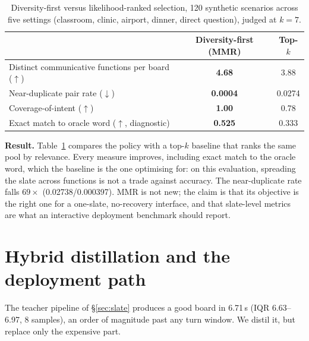 \begin{table}[t]
\centering
\small
\caption{Diversity-first versus likelihood-ranked selection, 120 synthetic
scenarios across five settings (classroom, clinic, airport, dinner, direct
question), judged at $k{=}7$.}
\label{tab:selection}
\begin{tabular}{lcc}
\toprule
 & \textbf{Diversity-first (MMR)} & \textbf{Top-$k$} \\
\midrule
Distinct communicative functions per board ($\uparrow$) & \textbf{4.68} & 3.88 \\
Near-duplicate pair rate ($\downarrow$)                 & \textbf{0.0004} & 0.0274 \\
Coverage-of-intent ($\uparrow$)\footnotemark            & \textbf{1.00} & 0.78 \\
Exact match to oracle word ($\uparrow$, diagnostic)      & \textbf{0.525} & 0.333 \\
\bottomrule
\end{tabular}
\end{table}

\textbf{Result.} Table~\ref{tab:selection} compares
the policy with a top-$k$ baseline that ranks the same pool by relevance. Every
measure improves, including exact match to the oracle word, which the baseline
is the one optimising for: on this evaluation, spreading the slate across
functions is not a trade against accuracy. The near-duplicate rate falls
$69\times$ (0.02738/0.000397). MMR is not new; the claim is that its objective is
the right one for a one-slate, no-recovery interface, and that slate-level
metrics are what an interactive deployment benchmark should report.

\section{Hybrid distillation and the deployment path}\label{sec:distil}

The teacher pipeline of \S\ref{sec:slate} produces a good board in 6.71\,s (IQR
6.63--6.97, 8 samples), an order of magnitude past any turn window. We distil
it, but replace only the expensive part.

